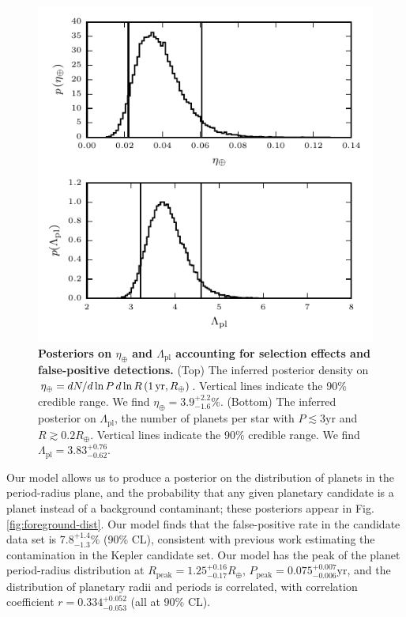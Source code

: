 \documentclass[apjl]{emulateapj}
\newcommand{\etaearth}{\eta_\oplus}
\newcommand{\Rpeak}{R_\mathrm{peak}}
\newcommand{\REarth}{R_\oplus}
\newcommand{\Rpl}{\Lambda_\mathrm{pl}}
\newcommand{\earange}{3.9_{-1.6}^{+2.2}\%}
\newcommand{\rplrange}{3.83_{-0.62}^{+0.76}}
\newcommand{\rpeakrange}{1.25_{-0.17}^{+0.16}}
\newcommand{\corrcoeffrange}{0.334_{-0.053}^{+0.052}}
\newcommand{\fposrange}{7.8_{-1.3}^{+1.4}\%}
\newcommand{\ppeakrange}{0.075_{-0.006}^{+0.007}}
\begin{document}
\begin{figure}
  \includegraphics[width=\columnwidth]{pars}
  \caption{\label{fig:eta-earth} \textbf{Posteriors on $\etaearth$ and
      $\Rpl$ accounting for selection effects and false-positive
      detections.}  (Top) The inferred posterior density on $\etaearth
    = dN/d\ln P \, d\ln R \left( 1\, \textnormal{yr}, R_\oplus
    \right)$.  Vertical lines indicate the 90\% credible range.  We
    find $\etaearth = \earange$.  (Bottom) The inferred posterior on
    $\Rpl$, the number of planets per star with $P \lesssim 3
    \mathrm{yr}$ and $R \gtrsim 0.2 \REarth$.  Vertical lines indicate
    the 90\% credible range.  We find $\Rpl = \rplrange$.}
\end{figure}

Our model allows us to produce a posterior on the distribution of
planets in the period-radius plane, and the probability that any given
planetary candidate is a planet instead of a background contaminant;
these posteriors appear in Fig. \ref{fig:foreground-dist}.  Our model
finds that the false-positive rate in the candidate data set is
$\fposrange$ (90\% CL), consistent with previous work
\citep{Morton2011,Fressin2013} estimating the contamination in the
Kepler candidate set.  Our model has the peak of the planet
period-radius distribution at $\Rpeak = \rpeakrange \REarth$,
$P_\mathrm{peak} = \ppeakrange \mathrm{yr}$, and the distribution of
planetary radii and periods is correlated, with correlation
coefficient $r = \corrcoeffrange$ (all at 90\% CL).
\end{document}
